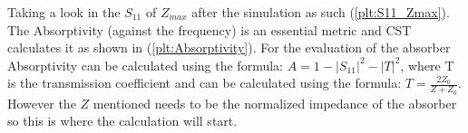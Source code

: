         Taking a look in the $S_{11}$ of $Z_{max}$ after the simulation as such
        (\ref{plt:S11_Zmax}). The Absorptivity (against the frequency) is an
        essential metric and CST calculates it as shown in (\ref{plt:Absorptivity}).
        For the evaluation of the absorber Absorptivity can be calculated using the
        formula: $ A = 1 - |S_{11}|^2 - |T|^2 $, where T is the transmission
        coefficient and can be calculated using the formula: $T =
        \frac{2Z_0}{Z+Z_0}$. However the $Z$ mentioned needs to be the normalized
        impedance of the absorber so this is where the calculation will start.

        \begin{center}
            \begin{minipage}{.45\textwidth}
                \label{plt:S11_Zmax}
            \end{minipage}
            \begin{minipage}{.45\textwidth}
                \label{plt:Absorptivity}
            \end{minipage}
        \end{center}
       
